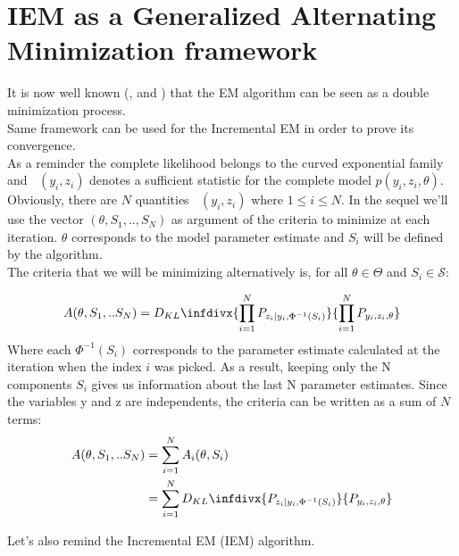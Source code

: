 \documentclass{article}
\theoremstyle{plain}
\DeclareMathOperator*{\St}{\tilde{S}}
\theoremstyle{plain}
\theoremstyle{definition}
\newcommand{\infdiv}{D_{KL}\infdivx}
\begin{document}
\section{IEM as a Generalized Alternating Minimization framework}
It is now well known (\citep{csiszar}, \citep{tibshirani} and \citep{gunawardana}) that the EM algorithm can be seen as a double minimization process.\\
Same framework can be used for the Incremental EM in order to prove its convergence.\\
As a reminder the complete likelihood belongs to the curved exponential family and $\St(y_i,z_i)$ denotes a sufficient statistic for the complete model $p(y_i,z_i,\theta)$. Obviously, there are $N$ quantities $\St(y_i,z_i)$ where $1\leq i \leq N$.
In the sequel we'll use the vector $(\theta, S_1,..,S_N)$ as argument of the criteria to minimize at each iteration. $\theta$ corresponds to the model parameter estimate and $S_i$ will be defined by the algorithm.\\

\noindent The criteria that we will be minimizing alternatively is, for all $\theta \in \Theta$ and $S_i \in \mathcal{S}$:

\begin{equation}
A(\theta, S_1,..S_N) = \infdiv{\prod_{i=1}^{N}{P_{z_i|y_i,\Phi^{-1}(S_i
)}}}{\prod_{i=1}^{N}{P_{y_i,z_i,\theta}}}
\end{equation}
Where each $\Phi^{-1}(S_i)$ corresponds to the parameter estimate calculated at the iteration when the index $i$ was picked. As a result, keeping only the N components $S_i$ gives us information about the last N parameter estimates.
Since the variables y and z are independents, the criteria can be written as a sum of $N$ terms:
\begin{equation}
\begin{split}
A(\theta, S_1,..S_N) & = \sum_{i=1}^{N}{A_i(\theta,S_i)}\\
& = \sum_{i=1}^{N}{\infdiv{P_{z_i|y_i,\Phi^{-1}(S_i)}}{P_{y_i,z_i,\theta}}}
\end{split}
\end{equation}

Let's also remind the Incremental EM (IEM) algorithm.
\end{document}
